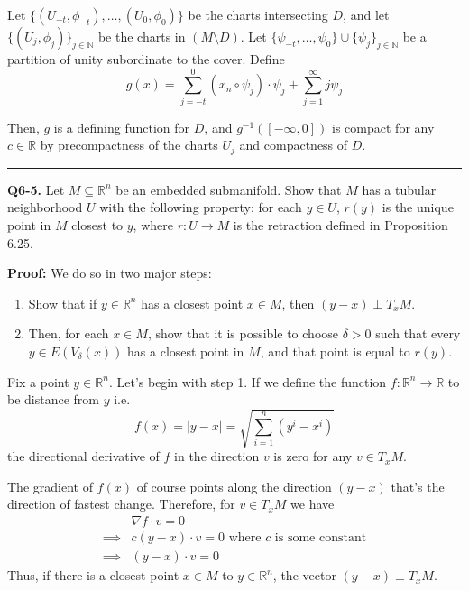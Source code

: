 \documentclass{article}
\newcommand{\R}{\mathbb{R}}
\begin{document}
\vskip 0.25cm
Let $\{ (U_{-t}, \phi_{-t}), \dots, (U_0, \phi_0) \}$ be the charts intersecting $D$, and let $\{(U_j, \phi_j) \}_{j \in \mathbb{N}}$ be the charts in $(M \setminus D)$. Let $\{ \psi_{-t}, \dots, \psi_0 \} \cup \{\psi_j\}_{j \in \mathbb{N}}$ be a partition of unity subordinate to the cover. Define
\[ g(x) = \sum_{j = -t}^{0} \left(x_n \circ \psi_j\right) \cdot \psi_j + \sum_{j = 1}^{\infty} j \psi_j \]

Then, $g$ is a defining function for $D$, and $g^{-1}([-\infty, 0])$ is compact for any $c \in \R$ by precompactness of the charts $U_j$ and compactness of $D$.

\vskip 0.5cm
\hrule 
\vskip 0.5cm


\textbf{Q6-5.}  Let $M \subseteq \R^n$ be an embedded submanifold. Show that $M$ has a tubular neighborhood $U$ with the following property: for each $y \in U$, $r(y)$ is the
unique point in $M$ closest to $y$, where $r : U \rightarrow M$ is the retraction defined in Proposition 6.25.

\vskip 0.5cm
\textbf{Proof:}
We do so in two major steps:
\begin{enumerate}
  \item Show that if $y \in \R^n$ has a closest point $x \in M$, then $(y-x) \perp T_xM$.
  \item Then, for each $x \in M$, show that it is possible to choose $\delta > 0$ such that every $y \in E \left(V_{\delta}(x)\right)$ has a closest point in $M$, and that point is equal to $r(y)$.
\end{enumerate}

\vskip 0.25cm
Fix a point $y \in \R^n$. Let's begin with step 1. If we define the function $f : \R^n \rightarrow \R$ to be distance from $y$ i.e. \[ f(x) = |y - x| = \sqrt{\sum_{i = 1}^n \left(y^i - x^i\right)}  \] the directional derivative of $f$ in the direction $v$ is zero for any $v \in T_x M$. 

\vskip 0.25cm
The gradient of $f(x)$ of course points along the direction $(y-x)$ that's the direction of fastest change. Therefore, for $v \in T_x M$ we have 
\begin{align*}
  &\nabla f \cdot v = 0\\
  \implies &c(y-x) \cdot v = 0 \text{   where $c$ is some constant}\\
  \implies& (y-x) \cdot v = 0
\end{align*}
Thus, if there is a closest point $x \in M$ to $y \in \R^n$, the vector $(y-x) \perp T_x M$.
\end{document}
